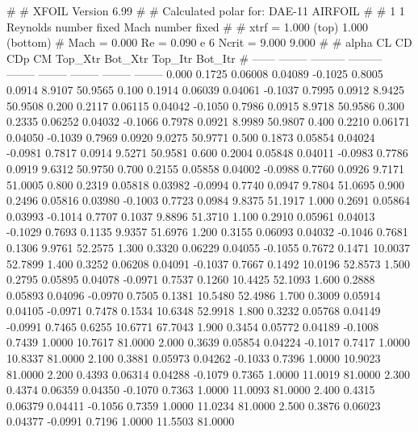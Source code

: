 #  
#       XFOIL         Version 6.99
#  
# Calculated polar for: DAE-11 AIRFOIL                                  
#  
# 1 1 Reynolds number fixed          Mach number fixed         
#  
# xtrf =   1.000 (top)        1.000 (bottom)  
# Mach =   0.000     Re =     0.090 e 6     Ncrit =   9.000  9.000
#  
#   alpha    CL        CD       CDp       CM     Top_Xtr  Bot_Xtr  Top_Itr  Bot_Itr
#  ------ -------- --------- --------- -------- -------- -------- -------- --------
   0.000   0.1725   0.06008   0.04089  -0.1025   0.8005   0.0914   8.9107  50.9565
   0.100   0.1914   0.06039   0.04061  -0.1037   0.7995   0.0912   8.9425  50.9508
   0.200   0.2117   0.06115   0.04042  -0.1050   0.7986   0.0915   8.9718  50.9586
   0.300   0.2335   0.06252   0.04032  -0.1066   0.7978   0.0921   8.9989  50.9807
   0.400   0.2210   0.06171   0.04050  -0.1039   0.7969   0.0920   9.0275  50.9771
   0.500   0.1873   0.05854   0.04024  -0.0981   0.7817   0.0914   9.5271  50.9581
   0.600   0.2004   0.05848   0.04011  -0.0983   0.7786   0.0919   9.6312  50.9750
   0.700   0.2155   0.05858   0.04002  -0.0988   0.7760   0.0926   9.7171  51.0005
   0.800   0.2319   0.05818   0.03982  -0.0994   0.7740   0.0947   9.7804  51.0695
   0.900   0.2496   0.05816   0.03980  -0.1003   0.7723   0.0984   9.8375  51.1917
   1.000   0.2691   0.05864   0.03993  -0.1014   0.7707   0.1037   9.8896  51.3710
   1.100   0.2910   0.05961   0.04013  -0.1029   0.7693   0.1135   9.9357  51.6976
   1.200   0.3155   0.06093   0.04032  -0.1046   0.7681   0.1306   9.9761  52.2575
   1.300   0.3320   0.06229   0.04055  -0.1055   0.7672   0.1471  10.0037  52.7899
   1.400   0.3252   0.06208   0.04091  -0.1037   0.7667   0.1492  10.0196  52.8573
   1.500   0.2795   0.05895   0.04078  -0.0971   0.7537   0.1260  10.4425  52.1093
   1.600   0.2888   0.05893   0.04096  -0.0970   0.7505   0.1381  10.5480  52.4986
   1.700   0.3009   0.05914   0.04105  -0.0971   0.7478   0.1534  10.6348  52.9918
   1.800   0.3232   0.05768   0.04149  -0.0991   0.7465   0.6255  10.6771  67.7043
   1.900   0.3454   0.05772   0.04189  -0.1008   0.7439   1.0000  10.7617  81.0000
   2.000   0.3639   0.05854   0.04224  -0.1017   0.7417   1.0000  10.8337  81.0000
   2.100   0.3881   0.05973   0.04262  -0.1033   0.7396   1.0000  10.9023  81.0000
   2.200   0.4393   0.06314   0.04288  -0.1079   0.7365   1.0000  11.0019  81.0000
   2.300   0.4374   0.06359   0.04350  -0.1070   0.7363   1.0000  11.0093  81.0000
   2.400   0.4315   0.06379   0.04411  -0.1056   0.7359   1.0000  11.0234  81.0000
   2.500   0.3876   0.06023   0.04377  -0.0991   0.7196   1.0000  11.5503  81.0000
